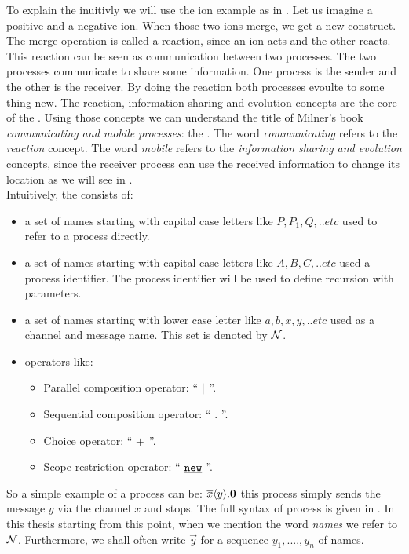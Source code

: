 To explain the \picalc{} inuitivly we will use the ion example as in \cite{milner}. Let us imagine a positive and a negative ion. When those two ions merge, we get a new construct. The merge operation is called a reaction, since an ion acts and the other reacts. This reaction can be seen as communication between two processes. The two processes communicate to share some information.  One process is the sender and the other is the receiver. By doing the reaction both processes evoulte to some thing new. The reaction, information sharing and evolution concepts are the core of the \picalc{}. Using those concepts we can understand the title of Milner's book \textit{communicating and mobile processes}: the \picalc{} \cite{milner}. The word \textit{communicating} refers to the \textit{reaction} concept. The word \textit{mobile} refers to the \textit{information sharing and evolution} concepts, since the receiver process can use the received information to change its location as we will see in .
\\Intuitively, the \picalc{} consists of: 
\begin{itemize}
\item a set of names starting with capital case letters  like $P, P_1, Q,..etc$  used to refer to a process directly.
\item a set of names starting with capital case letters  like $A, B, C,..etc$  used a process identifier. The process identifier will be used to define recursion with parameters.
\item a set of names starting with lower case letter like $a, b, x, y,..etc$  used as a channel and message name. This set is denoted by $\mathcal N$.
\item operators like:
	\begin{itemize}
	\item  Parallel composition operator: `` $\mid$ ''.
	\item  Sequential composition operator: `` $.$ ''.
	\item  Choice operator: `` $+$ ''.
	\item  Scope restriction operator: `` $\procres{}{}$ ''.
	\end{itemize}
\end{itemize}
So a simple example of a process can be: $\overline{x}\langle y\rangle.\mathbf{0}$ this process simply sends the message $y$ via the channel $x$ and stops.
The full syntax of \picalc{} process is given in . In this thesis starting from this point, when we mention the word \textit{names} we refer to $\mathcal N$. Furthermore, we shall often write $\vec{y}$ for a sequence $y_1,....,y_n$ of names.
